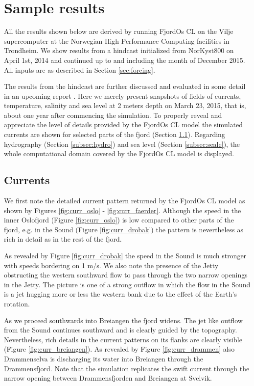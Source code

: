 \section{Sample results}
\label{sec:resul}
All the results shown below are derived by running FjordOs CL on the Vilje supercomputer at the Norwegian High Performance Computing facilities in Trondheim. We show results from a hindcast initialized from NorKyst800 on April 1st, 2014 and continued up to and including the month of December 2015. All inputs are as described in Section \ref{sec:forcing}.
 
The results from the hindcast are further discussed and evaluated in some detail in an upcoming report \citep{hjelm:etal:2016}. Here we merely present snapshots of fields of currents, temperature, salinity and sea level at 2 meters depth on March 23, 2015, that is, about one year after commencing the simulation. To properly reveal and appreciate the level of details provided by the FjordOs CL model the simulated currents are shown for selected parts of the fjord (Section \ref{subsec:curre}). Regarding hydrography (Section \ref{subsec:hydro}) and sea level (Section \ref{subsec:seale}), the whole computational domain covered by the FjordOs CL model is displayed.

\subsection{Currents}
\label{subsec:curre}
We first note the detailed current pattern returned by the FjordOs CL model as shown by Figures \ref{fig:curr_oslo} - \ref{fig:curr_faerder}. Although the speed in the inner Oslofjord (Figure \ref{fig:curr_oslo}) is low compared to other parts of the fjord, e.g. in the {\DR} Sound (Figure \ref{fig:curr_drobak}) the pattern is nevertheless as rich in detail as in the rest of the fjord. 
 
 
   

As revealed by Figure \ref{fig:curr_drobak} the speed in the {\DR} Sound is much stronger with speeds bordering on 1 m/s. We also note the presence of the Jetty obstructing the western southward flow to pass through the two narrow openings in the Jetty. The picture is one of a strong outflow in which the flow in the {\DR} Sound is a jet hugging more or less the western bank due to the effect of the Earth's rotation.   

As we proceed southwards into Breiangen the fjord widens. The jet like outflow from the {\DR} Sound continues southward and is clearly guided by the topography. Nevertheless, rich details in the current patterns on its flanks  are clearly visible (Figure \ref{fig:curr_breiangen}). As revealed by Figure \ref{fig:curr_drammen} also Drammenselva is discharging its water into Breiangen through the Drammensfjord. Note that the simulation replicates the swift current through the narrow opening between Drammensfjorden and Breiangen at Svelvik.  
% 
 

